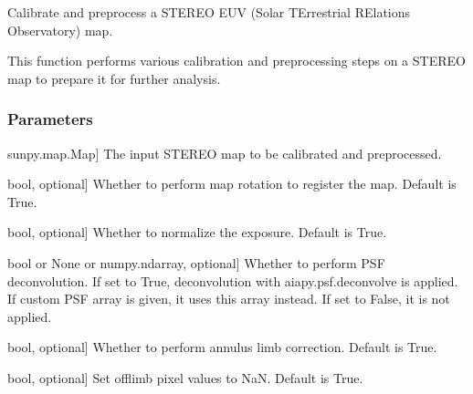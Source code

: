\documentclass[letterpaper,10pt,english]{sphinxmanual}
\begin{document}

\begin{fulllineitems}
\label{\detokenize{pycatch/utils/calibration:pycatch.utils.calibration.calibrate_stereo}}
\pysigstartsignatures
{}
\pysigstopsignatures
\sphinxAtStartPar
Calibrate and preprocess a STEREO EUV (Solar TErrestrial RElations Observatory) map.

\sphinxAtStartPar
This function performs various calibration and preprocessing steps on a STEREO map to prepare it for further analysis.


\subsubsection{Parameters}
\label{\detokenize{pycatch/utils/calibration:id5}}\begin{description}
\sphinxlineitem{map}{[}sunpy.map.Map{]}
\sphinxAtStartPar
The input STEREO map to be calibrated and preprocessed.

\sphinxlineitem{register}{[}bool, optional{]}
\sphinxAtStartPar
Whether to perform map rotation to register the map. Default is True.

\sphinxlineitem{normalize}{[}bool, optional{]}
\sphinxAtStartPar
Whether to normalize the exposure. Default is True.

\sphinxlineitem{deconvolve}{[}bool or None or numpy.ndarray, optional{]}
\sphinxAtStartPar
Whether to perform PSF deconvolution. If set to True, deconvolution with aiapy.psf.deconvolve is applied.
If custom PSF array is given, it uses this array instead. If set to False, it is not applied.

\sphinxlineitem{alc}{[}bool, optional{]}
\sphinxAtStartPar
Whether to perform annulus limb correction. Default is True.

\sphinxlineitem{cut\_limb}{[}bool, optional{]}
\sphinxAtStartPar
Set off\sphinxhyphen{}limb pixel values to NaN. Default is True.


\end{description}
\end{fulllineitems}
\end{document}
